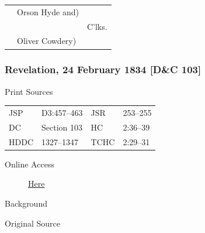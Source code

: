 					\begin{tabular}{p{3in}p{1.5in}p{1in}}
					 & Orson Hyde and) & \\
					 &  & C'lks. \\
					 & Oliver Cowdery) & \\
					 \end{tabular}
					 
		\subsubsection{Revelation, 24 February 1834 [D\&C 103]}
			\label{EMS-1834-JS-24-FEB-1834}
			
			\begin{description}
					\item[Print Sources]
				\end{description}

					\begin{tabular}{p{0.5in}p{1in}p{0.5in}p{1in}}
					JSP	 	& D3:457--463		& JSR 		& 253--255 \\
					DC	 	& Section 103 		& HC 		& 2:36--39 \\
					HDDC 	& 1327--1347		& TCHC 		& 2:29--31 \\
					\end{tabular}
				
				\begin{description}
					\item[Online Access] \href{https://www.josephsmithpapers.org/paper-summary/revelation-24-february-1834-dc-103/1}{Here}
				\end{description}
				
				\begin{description}
					\item[Background]
				\end{description}
				
				
				\begin{description}
					\item[Original Source]
				\end{description}
				
